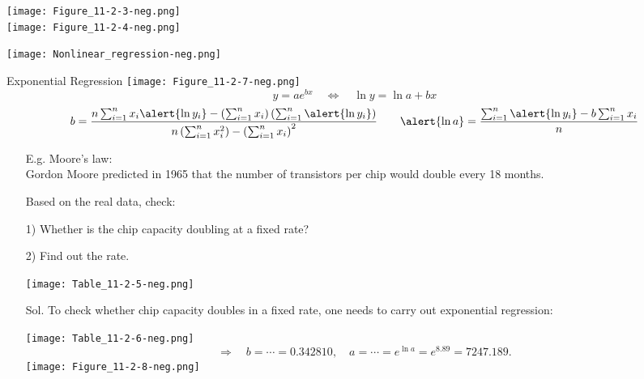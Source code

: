 \begin{frame}
\centering
\texttt{[image: Figure\_11-2-3-neg.png]}
\\
\texttt{[image: Figure\_11-2-4-neg.png]}
\end{frame}
\begin{frame}
	\centering
\texttt{[image: Nonlinear\_regression-neg.png]}
\end{frame}
\begin{frame}{Exponential Regression}
\centering
\texttt{[image: Figure\_11-2-7-neg.png]}
\vfill
\[
y=a e^{bx} \quad \Longleftrightarrow \quad \ln y = \ln a + b x
\]
\vfill
\[
b= \frac{n\sum_{i=1}^n x_i\alert{\ln y_i} - \left(\sum_{i=1}^n x_i\right)\left(\sum_{i=1}^n \alert{\ln y_i}\right)}{n\left(\sum_{i=1}^n x_i^2\right)-\left(\sum_{i=1}^n x_i\right)^2}
\qquad
\alert{\ln a} =  \frac{\sum_{i=1}^n\alert{\ln y_i}-b\sum_{i=1}^nx_i}{n}
\]
\end{frame}
\begin{frame}

\begin{enumerate}
\item[E.g.] Moore's law: \\[1em]
Gordon Moore predicted in 1965 that the number of transistors per chip would double every 18 months. \\[1em]
\item[] Based on the real data, check:
\item[] 1) Whether is the chip capacity doubling at a fixed rate?
\item[] 2) Find out the rate.
\vfill
\begin{center}
\texttt{[image: Table\_11-2-5-neg.png]}
\end{center}
\end{enumerate}
\end{frame}
\begin{frame}

\begin{enumerate}
\item[Sol.] To check whether chip capacity doubles in a fixed rate, one needs to
carry out exponential regression:
\vfill
\begin{center}
\texttt{[image: Table\_11-2-6-neg.png]}
\vfill
\[
\Longrightarrow\quad	b = \cdots = 0.342810, \quad a = \cdots = e^{\ln a} = e^{8.89} = 7247.189.
\]
\vfill
\texttt{[image: Figure\_11-2-8-neg.png]}
\end{center}
\end{enumerate}
\end{frame}
